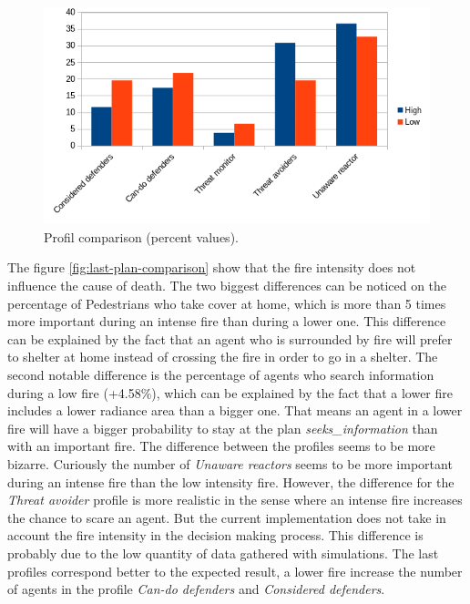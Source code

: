 \documentclass[12pt, a4paper]{memoir} %
\begin{document}
		\begin{figure}
			\begin{center}
				\includegraphics[scale=0.6]{profils-comparison.png}
				\caption{\label{fig:profils-comparison}Profil comparison (percent values).}
			\end{center}
		\end{figure}

		The figure \ref{fig:last-plan-comparison} show that the fire intensity does not influence the cause of death. The two biggest differences can
		be noticed on the percentage of Pedestrians who take cover at home, which is more than 5 times more important during an intense fire than
		during a lower one. This difference can be explained by the fact that an agent who is surrounded by fire will prefer to shelter at home instead of
		crossing the fire in order to go in a shelter. The second notable difference is the percentage of agents who search information during a low fire
		(+4.58\%), which can be explained by the fact that a lower fire includes a lower radiance area than a bigger one. That means an agent in a lower fire will
		have a bigger probability to stay at the plan \textit{seeks\_information} than with an important fire.
		\newline
		The difference between the profiles seems to be more bizarre. Curiously the number of \textit{Unaware reactors} seems to be more
		important during an intense fire than the low intensity fire. However, the difference for the \textit{Threat avoider} profile is more
		realistic in the sense where an intense fire increases the chance to scare an agent. But the current implementation does not take in account the
		fire intensity in the decision making process. This difference is probably due to the low quantity of data gathered with simulations. The last profiles
		correspond better to the expected result, a lower fire increase the number of agents in the profile \textit{Can-do defenders} and \textit{Considered defenders}.
\end{document}
